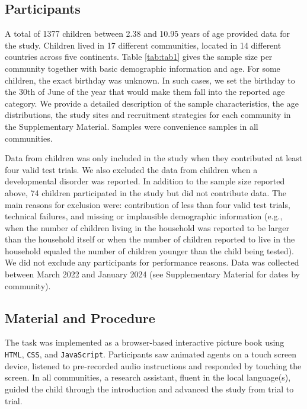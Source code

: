 \documentclass[
  man,floatsintext]{apa7}
\begin{document}
\subsection{Participants}\label{participants}

A total of 1377 children between 2.38 and 10.95 years of age provided data for the study. Children lived in 17 different communities, located in 14 different countries across five continents. Table \ref{tab:tab1} gives the sample size per community together with basic demographic information and age. For some children, the exact birthday was unknown. In such cases, we set the birthday to the 30th of June of the year that would make them fall into the reported age category. We provide a detailed description of the sample characteristics, the age distributions, the study sites and recruitment strategies for each community in the Supplementary Material. Samples were convenience samples in all communities.

Data from children was only included in the study when they contributed at least four valid test trials. We also excluded the data from children when a developmental disorder was reported. In addition to the sample size reported above, 74 children participated in the study but did not contribute data. The main reasons for exclusion were: contribution of less than four valid test trials, technical failures, and missing or implausible demographic information (e.g., when the number of children living in the household was reported to be larger than the household itself or when the number of children reported to live in the household equaled the number of children younger than the child being tested). We did not exclude any participants for performance reasons. Data was collected between March 2022 and January 2024 (see Supplementary Material for dates by community).

\subsection{Material and Procedure}\label{material-and-procedure}

The task was implemented as a browser-based interactive picture book using \texttt{HTML}, \texttt{CSS}, and \texttt{JavaScript}. Participants saw animated agents on a touch screen device, listened to pre-recorded audio instructions and responded by touching the screen. In all communities, a research assistant, fluent in the local language(s), guided the child through the introduction and advanced the study from trial to trial.
\end{document}
